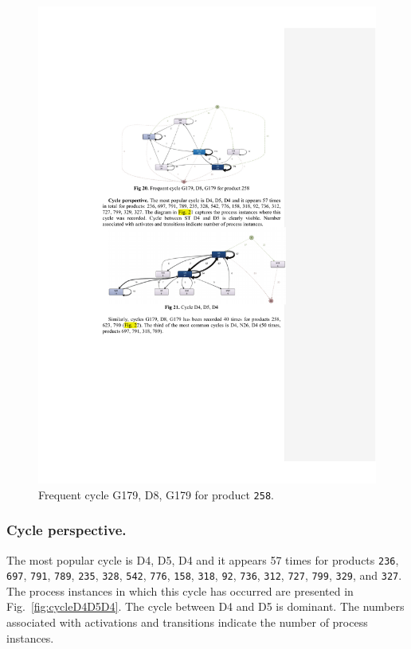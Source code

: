 \documentclass[lnbip]{svmultln}
\begin{document}
\begin{figure}
  \begin{center}
    \includegraphics[width=\textwidth]{"figs/pic 22"}
  \end{center}
  \caption{Frequent cycle G179, D8, G179 for product \texttt{258}.}
  \label{fig:cyclesFor258}
\end{figure}
 
\subsubsection{Cycle perspective.} The most popular cycle is D4, D5, D4 and it appears 57 times for products \texttt{236}, \texttt{697}, \texttt{791}, \texttt{789}, \texttt{235}, \texttt{328}, \texttt{542}, \texttt{776}, \texttt{158}, \texttt{318}, \texttt{92}, \texttt{736}, \texttt{312}, \texttt{727}, \texttt{799}, \texttt{329}, and \texttt{327}. The process instances in which this cycle has occurred are presented in Fig.~\ref{fig:cycleD4D5D4}. The cycle between D4 and D5 is dominant. The numbers associated with activations and transitions indicate the number of process instances.
 
\end{document}
